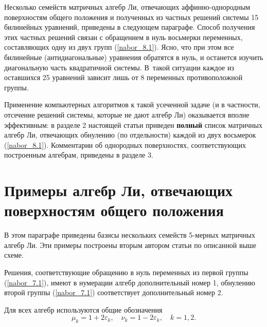    Несколько семейств матричных алгебр Ли, отвечающих
аффинно-однородным поверхностям общего положения и полученных из частных решений системы
15 билинейных уравнений, приведены в следующем параграфе. Способ получения этих частных
решений связан с обращением в нуль восьмерки переменных, составляющих одну из двух групп
(\ref{nabor_8.1}). Ясно, что при этом все билинейные (антидиагональные) уравнения обратятся в нуль,
и останется изучить диагональную часть квадратичной системы. В~такой ситуации каждое
из оставшихся 25 уравнений зависит лишь от 8 переменных противоположной группы.

   Применение компьютерных алгоритмов к такой усеченной задаче (и в частности, отсечение
решений системы, которые не дают алгебр Ли) оказывается вполне
эффективным: в разделе 2  настоящей статьи приведен {\bf полный} список
матричных алгебр Ли, отвечающих обнулению
(по отдельности) каждой из двух восьмерок (\ref{nabor_8.1}). Комментарии об однородных поверхностях,
соответствующих построенным алгебрам, приведены в разделе 3.



\section{Примеры алгебр Ли, отвечающих поверхностям общего положения}

  В этом параграфе приведены базисы нескольких семейств 5-мерных
матричных алгебр Ли. Эти примеры построены вторым автором статьи по
описанной выше схеме.

  Решения, соответствующие обращению в нуль переменных из
первой группы (\ref{nabor_7.1}), имеют в нумерации алгебр дополнительный номер 1,
обнулению второй группы (\ref{nabor_7.1}) соответствует дополнительный номер 2.

  Для всех алгебр используются общие обозначения
$$
    \mu_k = 1 + 2 \varepsilon_k, \quad
    \nu_k = 1 - 2 \varepsilon_k, \quad k = 1,2.
$$

